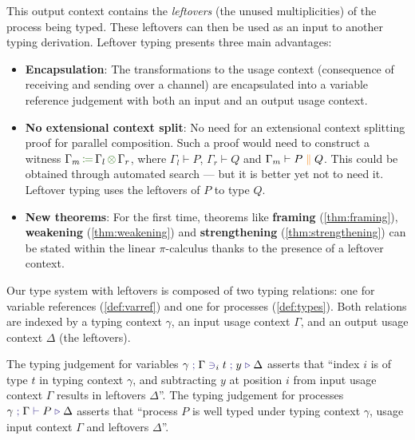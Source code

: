 \documentclass[a4paper,UKenglish,cleveref,autoref,thm-restate,authorcolumns]{lipics-v2019}
\theoremstyle{definition}
\newcommand{\picalc}{$\pi$-calculus}
\newcommand{\type}[1]{\textcolor{BlueViolet}{\operatorname{#1}}}
\newcommand{\constr}[1]{\textcolor{BurntOrange}{\operatorname{#1}}}
\newcommand{\func}[1]{\textcolor{OliveGreen}{\operatorname{#1}}}
\newcommand{\comp}[2]{#1 \; \constr{\parallel} \; #2}
\newcommand{\opctx}[3]{#1 \, \func{\coloneqq} \, #2 \, \func{\otimes} \, #3}
\newcommand{\types}[4]{#1 \; \type{;} \; #2 \; \type{\vdash} \; #3 \; \type{\triangleright} \; #4}
\newcommand{\contains}[6]{#1 \; \type{;} \; #2 \; \type{\ni}_{#3} \; #4 \; \type{;} \; #5 \; \type{\triangleright} \; #6}
\begin{document}
This output context contains the \emph{leftovers} (the unused multiplicities) of the process being typed.
These leftovers can then be used as an input to another typing derivation.
Leftover typing presents three main advantages:
\begin{itemize}
  \item \textbf{Encapsulation}:
    The transformations to the usage context (consequence of receiving and sending over a channel) are encapsulated into a variable reference judgement with both an input and an output usage context.
  \item \textbf{No extensional context split}:
    No need for an extensional context splitting proof for parallel composition.
    Such a proof would need to construct a witness $\opctx{\Gamma_m}{\Gamma_l}{\Gamma_r}$, where $\Gamma_l \vdash P$, $\Gamma_r \vdash Q$ and $\Gamma_m \vdash \comp{P}{Q}$.
    This could be obtained through automated search --- but it is better yet not to need it.
    Leftover typing uses the leftovers of $P$ to type $Q$.
  \item \textbf{New theorems}:
    For the first time, theorems like \textbf{framing} (\autoref{thm:framing}), \textbf{weakening} (\autoref{thm:weakening}) and \textbf{strengthening} (\autoref{thm:strengthening}) can be stated within the linear \picalc{} thanks to the presence of a leftover context.
\end{itemize}

Our type system with leftovers is composed of two typing relations: one for variable references (\autoref{def:varref}) and one for processes (\autoref{def:types}).
Both relations are indexed by a typing context $\gamma$, an input usage context $\Gamma$, and an output usage context $\Delta$ (the leftovers).

The typing judgement for variables $\contains{\gamma}{\Gamma}{i}{t}{y}{\Delta}$ asserts that ``index $i$ is of type $t$ in typing context $\gamma$, and subtracting $y$ at position $i$ from input usage context $\Gamma$ results in leftovers $\Delta$''.
The typing judgement for processes $\types{\gamma}{\Gamma}{P}{\Delta}$ asserts that ``process $P$ is well typed under typing context $\gamma$, usage input context $\Gamma$ and leftovers $\Delta$''.
\end{document}
